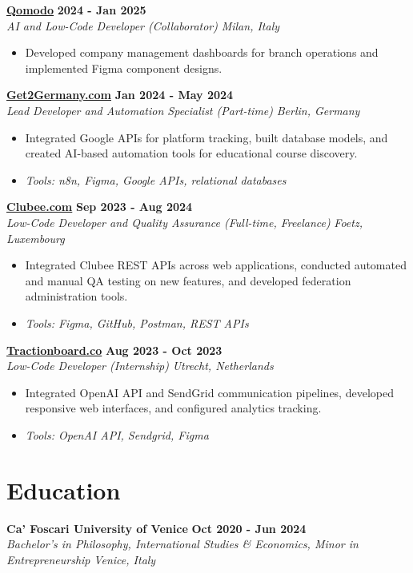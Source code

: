 \documentclass[a4paper,11pt]{article}
\newcommand{\role}[4]{%
 \textbf{#1} \hfill \textbf{#2}\\[1pt]%
 \textit{#3} \hfill \textit{#4}\\[2pt]%
}
\begin{document}
\role{\href{https://www.qomodo.me/}{Qomodo}}{2024 - Jan 2025}{AI and Low-Code Developer (Collaborator)}{Milan, Italy}
\begin{itemize}
 \item Developed company management dashboards for branch operations and implemented Figma component designs.
\end{itemize}

\role{\href{https://get2germany.com}{Get2Germany.com}}{Jan 2024 - May 2024}{Lead Developer and Automation Specialist (Part-time)}{Berlin, Germany}
\begin{itemize}
 \item Integrated Google APIs for platform tracking, built database models, and created AI-based automation tools for educational course discovery.
 \item \textit{Tools: n8n, Figma, Google APIs, relational databases}
\end{itemize}

\role{\href{https://clubee.com}{Clubee.com}}{Sep 2023 - Aug 2024}{Low-Code Developer and Quality Assurance (Full-time, Freelance)}{Foetz, Luxembourg}
\begin{itemize}
 \item Integrated Clubee REST APIs across web applications, conducted automated and manual QA testing on new features, and developed federation administration tools.
 \item \textit{Tools: Figma, GitHub, Postman, REST APIs}
\end{itemize}

\role{\href{https://tractionboard.co}{Tractionboard.co}}{Aug 2023 - Oct 2023}{Low-Code Developer (Internship)}{Utrecht, Netherlands}
\begin{itemize}
 \item Integrated OpenAI API and SendGrid communication pipelines, developed responsive web interfaces, and configured analytics tracking.
 \item \textit{Tools: OpenAI API, Sendgrid, Figma}
\end{itemize}

\section{Education}
\role{Ca' Foscari University of Venice}{Oct 2020 - Jun 2024}{Bachelor's in Philosophy, International Studies \& Economics, Minor in Entrepreneurship}{Venice, Italy}
\end{document}
